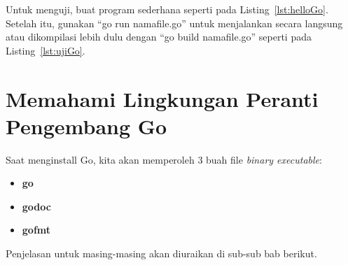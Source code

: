 Untuk menguji, buat program sederhana seperti pada Listing~\ref{lst:helloGo}. Setelah itu, gunakan ``go run namafile.go'' untuk menjalankan secara langsung atau dikompilasi lebih dulu dengan ``go build namafile.go'' seperti pada Listing~\ref{lst:ujiGo}.
	




\section{Memahami Lingkungan Peranti Pengembang Go}

Saat menginstall Go, kita akan memperoleh 3 buah file \textit{binary executable}:
\begin{itemize}
	\item \textbf{go}
	\item \textbf{godoc}
	\item \textbf{gofmt}
\end{itemize}

Penjelasan untuk masing-masing akan diuraikan di sub-sub bab berikut.

